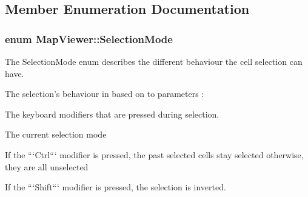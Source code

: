\subsection{\-Member \-Enumeration \-Documentation}
\hypertarget{class_map_viewer_a8a7a365452e5770c1fab21a9bfb0067d}{
\subsubsection[{\-Selection\-Mode}]{\setlength{\rightskip}{0pt plus 5cm}enum {\bf \-Map\-Viewer\-::\-Selection\-Mode}}}\label{class_map_viewer_a8a7a365452e5770c1fab21a9bfb0067d}


\-The \-Selection\-Mode enum describes the different behaviour the cell selection can have. 

\-The selection's behaviour in based on to parameters \-:
\begin{DoxyItemize}
\item \-The keyboard modifiers that are pressed during selection.
\item \-The current selection mode
\end{DoxyItemize}

\-If the ```\-Ctrl``` modifier is pressed, the past selected cells stay selected otherwise, they are all unselected

\-If the ```\-Shift``` modifier is pressed, the selection is inverted.


